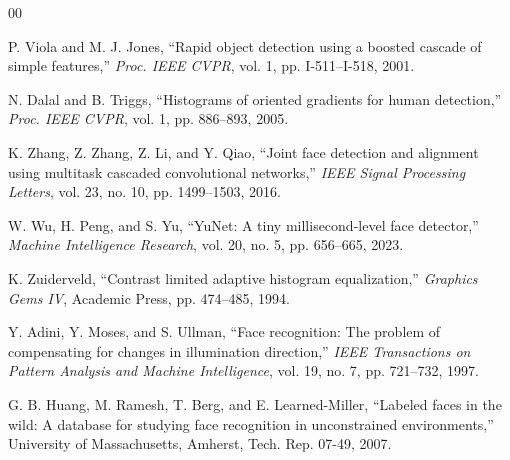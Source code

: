 \documentclass[conference]{IEEEtran}
\begin{document}
\begin{thebibliography}{00}

P. Viola and M. J. Jones, ``Rapid object detection using a boosted cascade of simple features,''
\textit{Proc. IEEE CVPR}, vol. 1, pp. I-511--I-518, 2001.

N. Dalal and B. Triggs, ``Histograms of oriented gradients for human detection,''
\textit{Proc. IEEE CVPR}, vol. 1, pp. 886--893, 2005.

K. Zhang, Z. Zhang, Z. Li, and Y. Qiao, ``Joint face detection and alignment using multitask cascaded convolutional networks,''
\textit{IEEE Signal Processing Letters}, vol. 23, no. 10, pp. 1499--1503, 2016.

W. Wu, H. Peng, and S. Yu, ``YuNet: A tiny millisecond-level face detector,''
\textit{Machine Intelligence Research}, vol. 20, no. 5, pp. 656--665, 2023.

K. Zuiderveld, ``Contrast limited adaptive histogram equalization,''
\textit{Graphics Gems IV}, Academic Press, pp. 474--485, 1994.

Y. Adini, Y. Moses, and S. Ullman, ``Face recognition: The problem of compensating for changes in illumination direction,''
\textit{IEEE Transactions on Pattern Analysis and Machine Intelligence}, vol. 19, no. 7, pp. 721--732, 1997.

G. B. Huang, M. Ramesh, T. Berg, and E. Learned-Miller, ``Labeled faces in the wild: A database for studying face recognition in unconstrained environments,''
University of Massachusetts, Amherst, Tech. Rep. 07-49, 2007.

\end{thebibliography}
\end{document}
